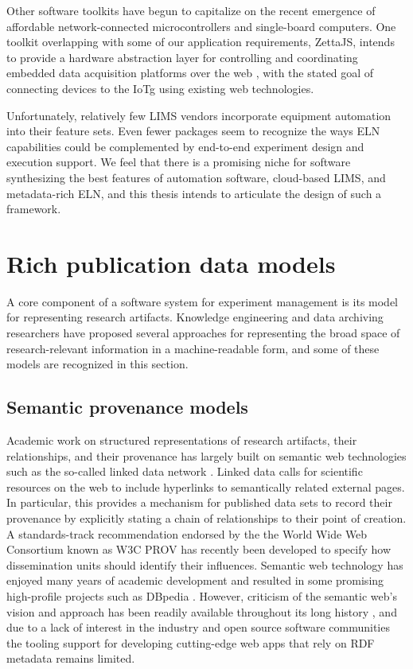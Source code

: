 \documentclass[../thesis]{subfiles}
\begin{document}
Other software toolkits have begun to capitalize on
the recent emergence of affordable network-connected microcontrollers
and single-board computers. One toolkit overlapping with some
of our application requirements, ZettaJS, intends to provide a
hardware abstraction layer for controlling and coordinating embedded
data acquisition platforms over the web \cite{ZettaJS}, with the
stated goal of connecting devices to the \gls{IoTg} using existing web
technologies.

Unfortunately, relatively few \gls{LIMS} vendors incorporate equipment
automation into their feature sets. Even fewer packages seem to
recognize the ways \gls{ELN} capabilities could be complemented by
end-to-end experiment design and execution support. We feel that there
is a promising niche for software synthesizing the best features of
automation software, cloud-based \gls{LIMS}, and metadata-rich
\gls{ELN}, and this thesis intends to articulate the design of such a
framework.



\section{Rich publication data models}
A core component of a software system for experiment management is its
model for representing research \glspl{artifact}. Knowledge
engineering and data archiving researchers have proposed several
approaches for representing the broad space of research-relevant
information in a machine-readable form, and some of these models are
recognized in this section.

\subsection{Semantic provenance models}
Academic work on structured representations of research artifacts,
their relationships, and their provenance has largely built on
semantic web technologies such as the so-called linked data network
\cite{LinkedData}. Linked data calls for scientific resources on the
web to include hyperlinks to semantically related external pages. In
particular, this provides a mechanism for published data sets to
record their provenance by explicitly stating a chain of relationships
to their point of creation. A standards-track recommendation endorsed
by the the World Wide Web Consortium known as W3C PROV \cite{PROV} has
recently been developed to specify how dissemination units should
identify their influences. Semantic web technology has enjoyed many
years of academic development and resulted in some promising
high-profile projects such as DBpedia \cite{DBpedia}. However,
criticism of the semantic web's vision and approach has been readily
available throughout its long history
\cite{Marshall:2003:SW:900051.900063}, and due to a lack of interest
in the industry and open source software communities the tooling
support for developing cutting-edge web apps that rely on \gls{RDF}
metadata remains limited.
\end{document}
